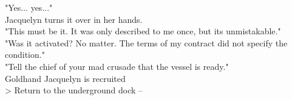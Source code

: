 "Yes... yes..."\\

Jacquelyn turns it over in her hands.\\

"This must be it. It was only described to me once, but its unmistakable."\\

"Was it activated? No matter. The terms of my contract did not specify the condition."\\

"Tell the chief of your mad crusade that the vessel is ready."\\

 Goldhand Jacquelyn is recruited\\
> Return to the underground dock -- 